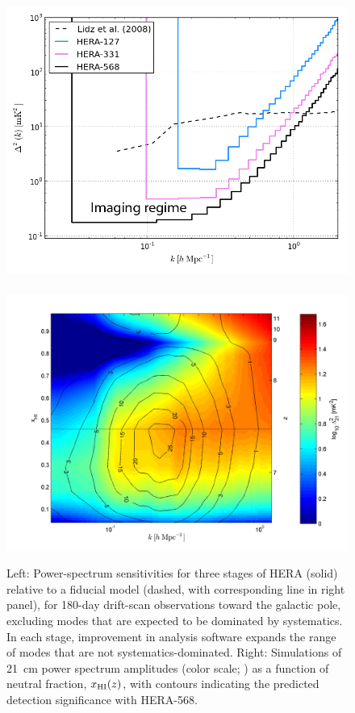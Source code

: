 \documentclass[preprint]{aastex}
\begin{document}
\begin{figure}[t]\centering
\includegraphics[height=2.20 in]{plots/eor_pspec.png}
~ %
\includegraphics[height=2.25 in]{plots/hera_snr_contour.png}
\caption{\small
Left: Power-spectrum sensitivities for three stages of
HERA (solid) relative to a fiducial model 
(dashed, with corresponding line in right panel), for
180-day drift-scan observations toward the galactic pole, excluding
modes that are expected to be
dominated by systematics.
In each stage, improvement in analysis software expands the range
of modes that are not systematics-dominated. 
Right: 
Simulations of 21~cm power spectrum amplitudes (color scale; \citealt{lidz_et_al2008})
as a function of neutral fraction, $x_{\rm HI}(z)$,
with contours indicating the predicted detection significance
with HERA-568.
}\label{fig:eor_pspec}
\end{figure}


\end{document}
